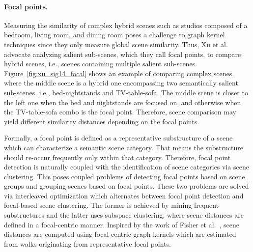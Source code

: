 %



\paragraph*{Focal points.}
Measuring the similarity of complex hybrid scenes such as studios composed of a bedroom, living room, and dining room poses a challenge to graph kernel techniques since they only measure global scene similarity. Thus, Xu et al.~ advocate analyzing salient sub-scenes, which they call focal points, to compare hybrid scenes, i.e., scenes containing multiple salient sub-scenes. Figure~\ref{fig:xu_sig14_focal} shows an example of comparing complex scenes, where
the middle scene is a hybrid one encompassing two semantically salient sub-scenes, i.e., bed-nightstands and TV-table-sofa.
The middle scene is closer to the left one when the bed and nightstands are focused on, and otherwise when the TV-table-sofa combo is the focal point.
Therefore, scene comparison may yield different similarity distances depending on the focal points.

Formally, a focal point is defined as a representative substructure of a scene which can characterize a semantic scene category. That means the substructure should re-occur frequently only within that category. Therefore, focal point detection is naturally coupled with the identification of scene categories via scene clustering. This poses coupled problems of detecting focal points based on scene groups and grouping scenes based on focal points.
These two problems are solved via interleaved optimization which alternates between focal point detection and focal-based scene clustering. The former is achieved by mining frequent substructures and the latter uses subspace clustering, where scene distances are defined in a focal-centric manner.  Inspired by the work of Fisher et al.~\cite{Fisher:2011:CSR}, scene distances are computed using focal-centric graph kernels which are estimated from walks originating from representative focal points.

